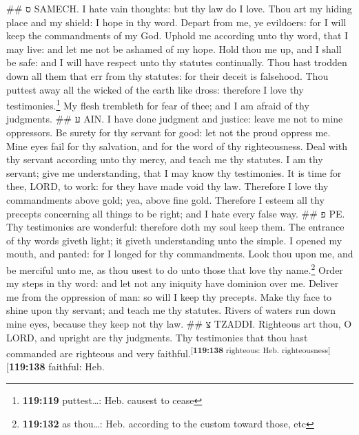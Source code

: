 \#\# ס SAMECH.  I hate vain thoughts: but thy law do I
love.  Thou art my hiding place and my shield: I hope in
thy word.  Depart from me, ye evildoers: for I will keep
the commandments of my God.  Uphold me according unto
thy word, that I may live: and let me not be ashamed of my hope.
 Hold thou me up, and I shall be safe: and I will have
respect unto thy statutes continually.  Thou hast
trodden down all them that err from thy statutes: for their deceit is
falsehood.  Thou puttest away all the wicked of the
earth like dross: therefore I love thy testimonies.\footnote{\textbf{119:119}
  puttest\ldots: Heb. causest to cease}  My flesh
trembleth for fear of thee; and I am afraid of thy judgments. \#\# ע
AIN.  I have done judgment and justice: leave me not to
mine oppressors.  Be surety for thy servant for good:
let not the proud oppress me.  Mine eyes fail for thy
salvation, and for the word of thy righteousness.  Deal
with thy servant according unto thy mercy, and teach me thy statutes.
 I am thy servant; give me understanding, that I may
know thy testimonies.  It is time for thee, LORD, to
work: for they have made void thy law.  Therefore I love
thy commandments above gold; yea, above fine gold. 
Therefore I esteem all thy precepts concerning all things to be right;
and I hate every false way. \#\# פ PE.  Thy testimonies
are wonderful: therefore doth my soul keep them.  The
entrance of thy words giveth light; it giveth understanding unto the
simple.  I opened my mouth, and panted: for I longed for
thy commandments.  Look thou upon me, and be merciful
unto me, as thou usest to do unto those that love thy name.\footnote{\textbf{119:132}
  as thou\ldots: Heb. according to the custom toward those, etc}
 Order my steps in thy word: and let not any iniquity
have dominion over me.  Deliver me from the oppression
of man: so will I keep thy precepts.  Make thy face to
shine upon thy servant; and teach me thy statutes. 
Rivers of waters run down mine eyes, because they keep not thy law. \#\#
צ TZADDI.  Righteous art thou, O LORD, and upright are
thy judgments.  Thy testimonies that thou hast commanded
are righteous and very faithful.\textsuperscript{{[}\textbf{119:138}
righteous: Heb. righteousness{]}}{[}\textbf{119:138} faithful: Heb.
